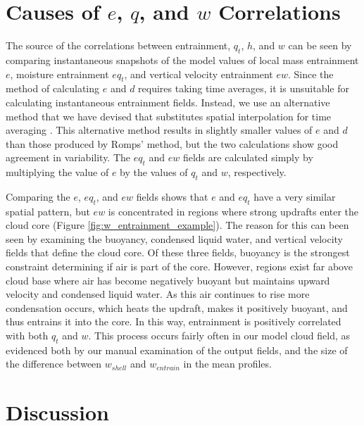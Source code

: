 \documentclass[12pt]{article}
\begin{document}

\section{Causes of $e$, $q$, and $w$ Correlations}

The source of the correlations between entrainment, $q_t$, $h$, and $w$ can 
be seen by comparing instantaneous snapshots of the model values of local mass entrainment $e$, moisture entrainment $e{q_t}$, and vertical velocity 
entrainment $e{w}$.  Since the \cite{Romps2010} method of calculating 
$e$ and $d$ requires taking time averages, it is unsuitable for calculating instantaneous entrainment fields.  Instead, we use an alternative method that 
we have devised that substitutes spatial interpolation for time averaging 
\citep{Dawe2011}.  This alternative method results in slightly smaller values 
of $e$ and $d$ than those produced by Romps' method, but the two calculations
show good agreement in variability. The $eq_t$ and $ew$ fields are calculated simply by
multiplying the value of $e$ by the values of $q_t$ and $w$, respectively.

Comparing the $e$, $eq_t$, and $ew$ fields shows that $e$ and $eq_t$ have a 
very similar spatial pattern, but $ew$ is concentrated in regions where strong
updrafts enter the cloud core (Figure \ref{fig:w_entrainment_example}).  The
reason for this can been seen by examining the buoyancy, condensed liquid water,
and vertical velocity fields that define the cloud core.  Of these three fields,
buoyancy is the strongest constraint determining if air is part of the core.
However, regions exist far above cloud base where air has become negatively buoyant but maintains upward velocity and condensed liquid water.  As this air
continues to rise more condensation occurs, which heats the updraft, makes it
positively buoyant, and thus entrains it into the core.  In this way, 
entrainment is positively correlated with both $q_t$ and $w$.  This process
occurs fairly often in our model cloud field, as evidenced both by our manual
examination of the output fields, and the size of the difference between 
$w_{shell}$ and $w_{entrain}$ in the mean profiles.


\section{Discussion}
\end{document}
